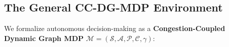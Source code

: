\documentclass[11pt,a4paper]{article}
\begin{document}

\subsection{The General CC-DG-MDP Environment}
We formalize autonomous decision-making as a \textbf{Congestion-Coupled Dynamic Graph MDP} $\mathcal{M} = (\mathcal{S}, \mathcal{A}, \mathcal{P}, \mathcal{C}, \gamma)$:
\end{document}

